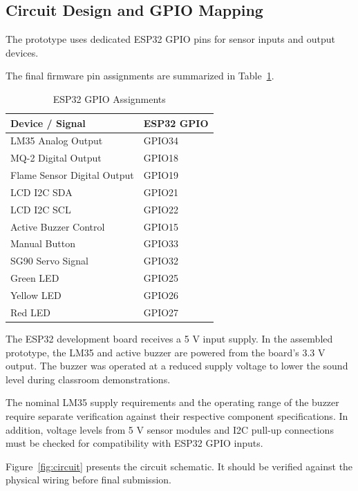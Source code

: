 \documentclass[12pt,a4paper]{article}
\begin{document}
\subsection{Circuit Design and GPIO Mapping}

The prototype uses dedicated ESP32 GPIO pins
for sensor inputs and output devices.

The final firmware pin assignments are summarized
in Table~\ref{tab:gpio}.

\begin{table}[!htbp]
\centering
\caption{ESP32 GPIO Assignments}
\label{tab:gpio}
\renewcommand{\arraystretch}{1.15}
\begin{tabular}{|p{7cm}|p{3cm}|}
\hline
\textbf{Device / Signal} &
\textbf{ESP32 GPIO} \\
\hline
LM35 Analog Output & GPIO34 \\
\hline
MQ-2 Digital Output & GPIO18 \\
\hline
Flame Sensor Digital Output & GPIO19 \\
\hline
LCD I2C SDA & GPIO21 \\
\hline
LCD I2C SCL & GPIO22 \\
\hline
Active Buzzer Control & GPIO15 \\
\hline
Manual Button & GPIO33 \\
\hline
SG90 Servo Signal & GPIO32 \\
\hline
Green LED & GPIO25 \\
\hline
Yellow LED & GPIO26 \\
\hline
Red LED & GPIO27 \\
\hline
\end{tabular}
\end{table}
\FloatBarrier

The ESP32 development board receives a 5 V
input supply. In the assembled prototype,
the LM35 and active buzzer are powered from
the board's 3.3 V output. The buzzer was
operated at a reduced supply voltage to
lower the sound level during classroom
demonstrations.

The nominal LM35 supply requirements and
the operating range of the buzzer require
separate verification against their respective
component specifications. In addition,
voltage levels from 5 V sensor modules
and I2C pull-up connections must be checked
for compatibility with ESP32 GPIO inputs.

Figure~\ref{fig:circuit} presents the circuit
schematic. It should be verified against
the physical wiring before final submission.
\end{document}
